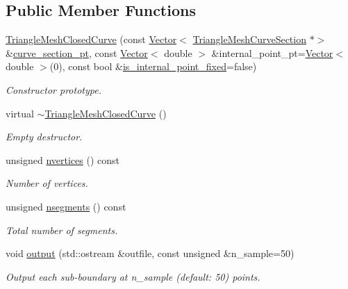 \subsection*{Public Member Functions}
\begin{DoxyCompactItemize}
\item 
\hyperlink{classoomph_1_1TriangleMeshClosedCurve_af24c98c4ee0fa9286d8d32df39980ad8}{Triangle\+Mesh\+Closed\+Curve} (const \hyperlink{classoomph_1_1Vector}{Vector}$<$ \hyperlink{classoomph_1_1TriangleMeshCurveSection}{Triangle\+Mesh\+Curve\+Section} $\ast$$>$ \&\hyperlink{classoomph_1_1TriangleMeshCurve_a8a8d36c6b35f1bffd760877da4f3d52f}{curve\+\_\+section\+\_\+pt}, const \hyperlink{classoomph_1_1Vector}{Vector}$<$ double $>$ \&internal\+\_\+point\+\_\+pt=\hyperlink{classoomph_1_1Vector}{Vector}$<$ double $>$(0), const bool \&\hyperlink{classoomph_1_1TriangleMeshClosedCurve_a5d48fa39b4cde1ba1bdba129a1587f2f}{is\+\_\+internal\+\_\+point\+\_\+fixed}=false)
\begin{DoxyCompactList}\small\item\em Constructor prototype. \end{DoxyCompactList}\item 
virtual \hyperlink{classoomph_1_1TriangleMeshClosedCurve_adfdc8f86bd3cddd2c126acae7385a3af}{$\sim$\+Triangle\+Mesh\+Closed\+Curve} ()
\begin{DoxyCompactList}\small\item\em Empty destructor. \end{DoxyCompactList}\item 
unsigned \hyperlink{classoomph_1_1TriangleMeshClosedCurve_a439e4085f7e220364bbe9bc8040ec72f}{nvertices} () const
\begin{DoxyCompactList}\small\item\em Number of vertices. \end{DoxyCompactList}\item 
unsigned \hyperlink{classoomph_1_1TriangleMeshClosedCurve_a6d8c26d0ecfaf5abff2f68fedf158612}{nsegments} () const
\begin{DoxyCompactList}\small\item\em Total number of segments. \end{DoxyCompactList}\item 
void \hyperlink{classoomph_1_1TriangleMeshClosedCurve_a246d71ca0cb2dbc9d2c9ad6976f84ba6}{output} (std\+::ostream \&outfile, const unsigned \&n\+\_\+sample=50)
\begin{DoxyCompactList}\small\item\em Output each sub-\/boundary at n\+\_\+sample (default\+: 50) points. \end{DoxyCompactList}\item 
$$
\end{DoxyCompactItemize}
